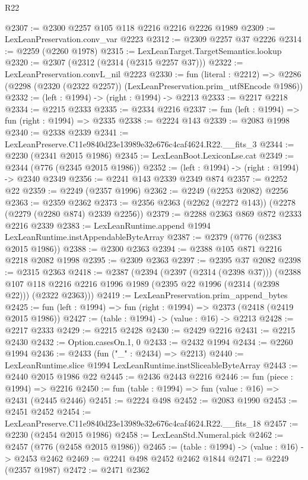 \begin{lexlean}{R22}
\begin{coremodule}
@2307 := @2300 @2257 @105 @118 @2216 @2216 @2226 @1989
@2309 := LexLeanPreservation.conv_var @2223
@2312 := @2309 @2257 @37 @2226
@2314 := @2259 (@2260 @1978)
@2315 := LexLeanTarget.TargetSemantics.lookup
@2320 := @2307 (@2312 (@2314 (@2315 @2257 @37)))
@2322 := LexLeanPreservation.convL_nil @2223
@2330 := fun (literal : @2212) =>
  @2286 (@2298 (@2320 (@2322 @2257)) (LexLeanPreservation.prim_utf8Encode @1986))
@2332 := (left : @1994) -> (right : @1994) -> @2213
@2333 := @2217 @2218
@2334 := @2215 @2333
@2335 := @2334 @2216
@2337 := fun (left : @1994) => fun (right : @1994) => @2335
@2338 := @2224 @143
@2339 := @2083 @1998
@2340 := @2338 @2339
@2341 := LexLeanPreserve.C11e9840d23e13989e32e676c4caf4624.R22.__fits_3
@2344 := @2230 (@2341 @2015 @1986)
@2345 := LexLeanBoot.LexiconLse.cat
@2349 := @2344 (@776 (@2345 @2015 @1986))
@2352 := (left : @1994) -> (right : @1994) -> @2340 @2349
@2356 := @2241 @143 @2339 @2349 @874
@2357 := @2252 @22
@2359 := @2249 (@2357 @1996)
@2362 := @2249 (@2253 @2082) @2256
@2363 := @2359 @2362
@2373 := @2356 @2363 (@2262 (@2272 @143)) (@2278 (@2279 (@2280 @874) @2339 @2256))
@2379 := @2288 @2363 @869 @872 @2333 @2216 @2339
@2383 := LexLeanRuntime.append @1994 LexLeanRuntime.instAppendableByteArray
@2387 := @2379 (@776 (@2383 @2015 @1986))
@2388 := @2300 @2363
@2394 := @2388 @105 @871 @2216 @2218 @2082 @1998
@2395 := @2309 @2363
@2397 := @2395 @37 @2082
@2398 := @2315 @2363
@2418 := @2387
    (@2394
      (@2397 (@2314 (@2398 @37)))
      (@2388 @107 @118 @2216 @2216 @1996 @1989 (@2395 @22 @1996 (@2314 (@2398 @22))) (@2322 @2363)))
@2419 := LexLeanPreservation.prim_append_bytes
@2425 := fun (left : @1994) => fun (right : @1994) => @2373 (@2418 (@2419 @2015 @1986))
@2427 := (table : @1994) -> (value : @16) -> @2213
@2428 := @2217 @2333
@2429 := @2215 @2428
@2430 := @2429 @2216
@2431 := @2215 @2430
@2432 := Option.casesOn.{1, 0}
@2433 := @2432 @1994
@2434 := @2260 @1994
@2436 := @2433 (fun ("_" : @2434) => @2213)
@2440 := LexLeanRuntime.slice @1994 LexLeanRuntime.instSliceableByteArray
@2443 := @2440 @2015 @1986 @22
@2445 := @2436 @2443 @2216
@2446 := fun (piece : @1994) => @2216
@2450 := fun (table : @1994) => fun (value : @16) => @2431 (@2445 @2446)
@2451 := @2224 @498
@2452 := @2083 @1990
@2453 := @2451 @2452
@2454 := LexLeanPreserve.C11e9840d23e13989e32e676c4caf4624.R22.__fits_18
@2457 := @2230 (@2454 @2015 @1986)
@2458 := LexLeanStd.Numeral.pick
@2462 := @2457 (@776 (@2458 @2015 @1986))
@2465 := (table : @1994) -> (value : @16) -> @2453 @2462
@2469 := @2241 @498 @2452 @2462 @1844
@2471 := @2249 (@2357 @1987)
@2472 := @2471 @2362

\end{coremodule}
\end{lexlean}
